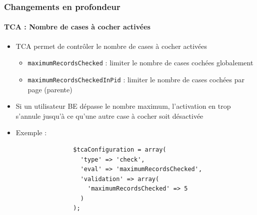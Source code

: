 \begin{frame}[fragile]
	\frametitle{Changements en profondeur}
	\framesubtitle{TCA : Nombre de cases à cocher activées}

	\lstset{
		basicstyle=\tiny\ttfamily
	}

	\begin{itemize}
		\item TCA permet de contrôler le nombre de cases à cocher activées

			\begin{itemize}
				\item \texttt{maximumRecordsChecked} :\newline
					limiter le nombre de cases cochées globalement
				\item \texttt{maximumRecordsCheckedInPid} :\newline
					limiter le nombre de cases cochées par page (parente)
			\end{itemize}

		\item Si un utilisateur BE dépasse le nombre maximum, l'activation en trop s'annule jusqu'à ce qu'une autre case à cocher soit désactivée

		\item Exemple :

			\begin{lstlisting}
				$tcaConfiguration = array(
				  'type' => 'check',
				  'eval' => 'maximumRecordsChecked',
				  'validation' => array(
				    'maximumRecordsChecked' => 5
				  )
				);
			\end{lstlisting}

	\end{itemize}

\end{frame}


